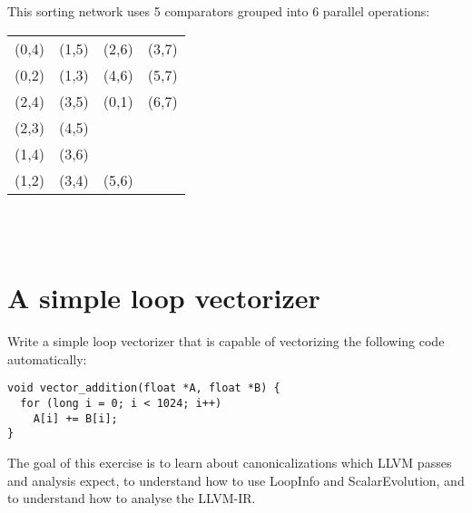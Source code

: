 \documentclass[12pt]{article}
\begin{document}
~\\
~\\
This sorting network uses 5 comparators grouped into 6 parallel operations:\\

\begin{tabular}{l|l|l|l}
(0,4)&(1,5)&(2,6)&(3,7)\\
(0,2)&(1,3)&(4,6)&(5,7)\\
(2,4)&(3,5)&(0,1)&(6,7)\\
(2,3)&(4,5)\\
(1,4)&(3,6)\\
(1,2)&(3,4)&(5,6)\\
\end{tabular}

~\\
~\\

\section{A simple loop vectorizer}

Write a simple loop vectorizer that is capable of vectorizing the following
code automatically:

\begin{verbatim}
void vector_addition(float *A, float *B) {
  for (long i = 0; i < 1024; i++)
    A[i] += B[i];
}
\end{verbatim}

The goal of this exercise is to learn about canonicalizations which LLVM
passes and analysis expect, to understand how to use LoopInfo and
ScalarEvolution, and to understand how to analyse the LLVM-IR.
\end{document}
